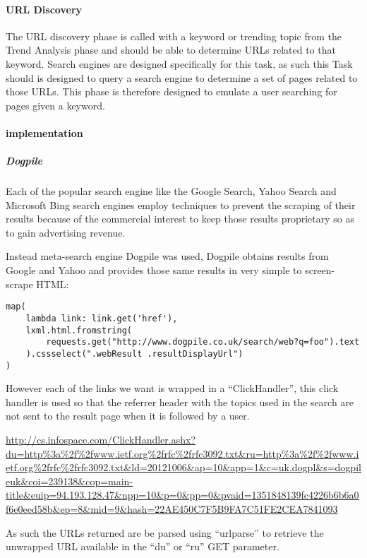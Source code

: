 \paragraph{URL Discovery}
The URL discovery phase is called with a keyword or trending topic from the Trend Analysis phase and should be able to determine URLs related to that keyword.  Search engines are designed specifically for this task, as such this Task should is designed to query a search engine to determine a set of pages related to those URLs. This phase is therefore designed to emulate a user searching for pages given a keyword.

\paragraph{implementation}
\subparagraph{Dogpile}
Each of the popular search engine like the Google Search, Yahoo Search and Microsoft Bing search engines employ techniques to prevent the scraping of their results because of the commercial interest to keep those results proprietary so as to gain advertising revenue.

Instead meta-search engine Dogpile was used, Dogpile obtains results from Google and Yahoo and provides those same results in very simple to screen-scrape HTML\cite{screen-scrape}:

\begin{verbatim}
map(
    lambda link: link.get('href'),
    lxml.html.fromstring(
        requests.get("http://www.dogpile.co.uk/search/web?q=foo").text
    ).cssselect(".webResult .resultDisplayUrl")
)
\end{verbatim}

However each of the links we want is wrapped in a ``ClickHandler'', this click handler is used so that the referrer header with the topics used in the search are not sent to the result page when it is followed by a user.

\url{http://cs.infospace.com/ClickHandler.ashx?du=http%
}

As such the URLs returned are be parsed using ``urlparse'' to retrieve the unwrapped URL available in the ``du'' or ``ru'' GET parameter\cite{rfc3092}.

